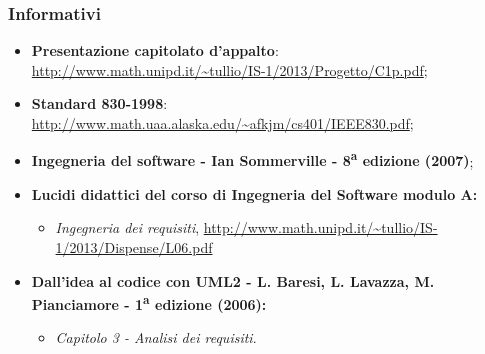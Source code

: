 	
	\subsubsection{Informativi}
		\begin{itemize}
			\item \textbf{Presentazione capitolato d'appalto}: \url{http://www.math.unipd.it/~tullio/IS-1/2013/Progetto/C1p.pdf};
			\item \textbf{Standard 830-1998}: \url{http://www.math.uaa.alaska.edu/~afkjm/cs401/IEEE830.pdf}; 
			\item \textbf{Ingegneria del software - Ian Sommerville - 8\textsuperscript{a} edizione (2007)};
			\item \textbf{Lucidi didattici del corso di Ingegneria del Software modulo A:}
			\begin{itemize}
				\item \textit{Ingegneria dei requisiti}, \url{http://www.math.unipd.it/~tullio/IS-1/2013/Dispense/L06.pdf}
			\end{itemize}
			\item \textbf{Dall'idea al codice con UML2 - L. Baresi, L. Lavazza, M. Pianciamore - 1\textsuperscript{a} edizione (2006):}
			\begin{itemize}			
				\item \textit{Capitolo 3 - Analisi dei requisiti}.			
			\end{itemize}
		\end{itemize}
		
